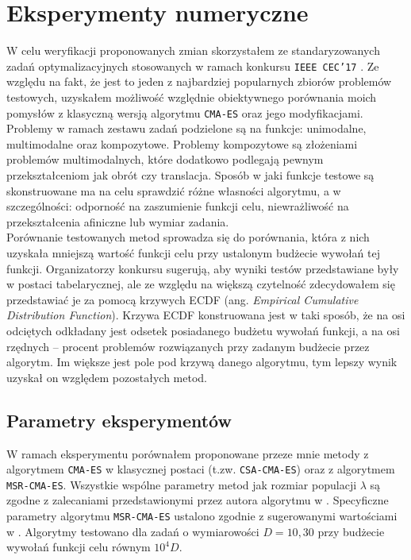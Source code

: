 \section{Eksperymenty numeryczne}
\label{section:eksperymenty}
  W celu weryfikacji proponowanych zmian skorzystałem ze standaryzowanych zadań optymalizacyjnych stosowanych w ramach konkursu
  \texttt{IEEE CEC'17} \cite{cec2017}. Ze względu na fakt, że jest to jeden z najbardziej popularnych zbiorów problemów testowych, uzyskałem
  możliwość względnie obiektywnego porównania moich pomysłów z klasyczną wersją algorytmu \texttt{CMA-ES} oraz jego modyfikacjami.\\
  \indent Problemy w ramach zestawu zadań podzielone są na funkcje: unimodalne, multimodalne oraz kompozytowe. Problemy kompozytowe są
  złożeniami problemów multimodalnych, które dodatkowo podlegają pewnym przekształceniom jak obrót czy translacja.
  Sposób w jaki funkcje testowe są skonstruowane ma na celu sprawdzić różne własności algorytmu, a w szczególności: odporność na zaszumienie funkcji celu,
  niewrażliwość na przekształcenia afiniczne lub wymiar zadania. \\
  \indent Porównanie testowanych metod sprowadza się do porównania, która z nich uzyskała mniejszą wartość funkcji celu przy ustalonym budżecie wywołań tej funkcji.
  Organizatorzy konkursu sugerują, aby wyniki testów przedstawiane były w postaci tabelarycznej, ale ze względu na większą czytelność zdecydowałem się przedstawiać je za pomocą krzywych ECDF (ang. \textit{Empirical Cumulative Distribution Function}). Krzywa ECDF konstruowana jest w taki sposób, że na osi odciętych odkładany jest odsetek posiadanego budżetu wywołań funkcji, a na osi rzędnych -- procent problemów rozwiązanych przy zadanym budżecie przez algorytm. Im większe jest pole pod krzywą danego algorytmu, tym lepszy wynik uzyskał on względem pozostałych metod.
  

\subsection{Parametry eksperymentów}
  W ramach eksperymentu porównałem proponowane przeze mnie metody z algorytmem \texttt{CMA-ES} w klasycznej postaci (t.zw. \texttt{CSA-CMA-ES}) oraz z algorytmem \texttt{MSR-CMA-ES}.
  Wszystkie wspólne parametry metod jak rozmiar populacji $\lambda$ są zgodne z zalecaniami przedstawionymi przez autora algorytmu w \cite{CMADEhansen}.
  Specyficzne parametry algorytmu \texttt{MSR-CMA-ES} ustalono zgodnie z sugerowanymi wartościami w \cite{Elhara13}. Algorytmy testowano dla zadań o wymiarowości $D = 10, 30$ przy budżecie wywołań funkcji celu równym $10^{4}D$.

